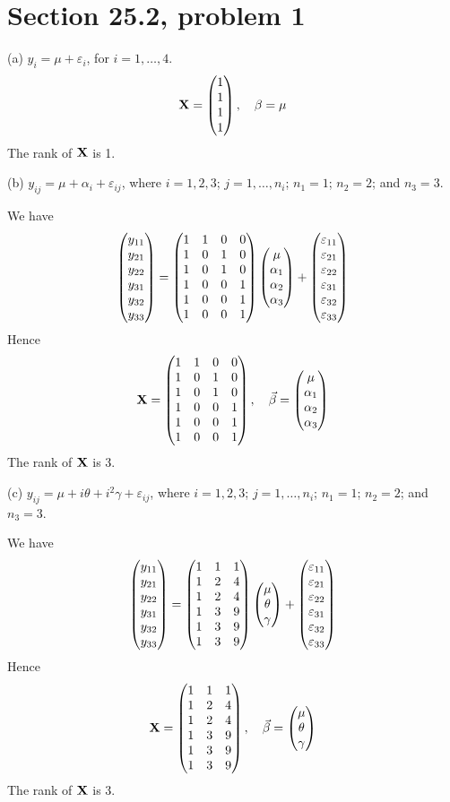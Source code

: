 \section{Section 25.2, problem 1}
(a) $y_i=\mu+\varepsilon_i$, for $i=1,\ldots,4$.
$${\bf X}=\left(\begin{matrix}1\cr1\cr1\cr1\end{matrix}\right),\quad
{\beta}=\mu$$
The rank of $\bf X$ is 1.

\bigskip
\noindent
(b) $y_{ij}=\mu+\alpha_i+\varepsilon_{ij}$,
where $i=1,2,3$; $j=1,\ldots,n_i$; $n_1=1$; $n_2=2$; and $n_3=3$.

\bigskip
\noindent
We have
$$\left(\begin{matrix}
y_{11}\cr y_{21}\cr y_{22}\cr y_{31}\cr y_{32}\cr y_{33}
\end{matrix}\right)=
\left(\begin{matrix}
1 & 1 & 0 & 0\cr
1 & 0 & 1 & 0\cr
1 & 0 & 1 & 0\cr
1 & 0 & 0 & 1\cr
1 & 0 & 0 & 1\cr
1 & 0 & 0 & 1
\end{matrix}\right)
\left(\begin{matrix}
\mu\cr\alpha_1\cr\alpha_2\cr\alpha_3
\end{matrix}\right)
+\left(\begin{matrix}
\varepsilon_{11}\cr
\varepsilon_{21}\cr
\varepsilon_{22}\cr
\varepsilon_{31}\cr
\varepsilon_{32}\cr
\varepsilon_{33}
\end{matrix}\right)
$$
Hence
$${\bf X}=\left(\begin{matrix}
1 & 1 & 0 & 0\cr
1 & 0 & 1 & 0\cr
1 & 0 & 1 & 0\cr
1 & 0 & 0 & 1\cr
1 & 0 & 0 & 1\cr
1 & 0 & 0 & 1
\end{matrix}\right),\quad
{\vec\beta}=\left(\begin{matrix}
\mu\cr\alpha_1\cr\alpha_2\cr\alpha_3
\end{matrix}\right)
$$
The rank of $\bf X$ is 3.

\bigskip
\noindent
(c) $y_{ij}=\mu+i\theta+i^2\gamma+\varepsilon_{ij}$,
where $i=1,2,3$; $j=1,\ldots,n_i$; $n_1=1$; $n_2=2$; and $n_3=3$.

\bigskip
\noindent
We have
$$\left(\begin{matrix}
y_{11}\cr y_{21}\cr y_{22}\cr y_{31}\cr y_{32}\cr y_{33}
\end{matrix}\right)=
\left(\begin{matrix}
1 & 1 & 1\cr
1 & 2 & 4\cr
1 & 2 & 4\cr
1 & 3 & 9\cr
1 & 3 & 9\cr
1 & 3 & 9
\end{matrix}\right)
\left(\begin{matrix}
\mu\cr\theta\cr\gamma
\end{matrix}\right)
+\left(\begin{matrix}
\varepsilon_{11}\cr
\varepsilon_{21}\cr
\varepsilon_{22}\cr
\varepsilon_{31}\cr
\varepsilon_{32}\cr
\varepsilon_{33}
\end{matrix}\right)
$$
Hence
$${\bf X}=\left(\begin{matrix}
1 & 1 & 1\cr
1 & 2 & 4\cr
1 & 2 & 4\cr
1 & 3 & 9\cr
1 & 3 & 9\cr
1 & 3 & 9
\end{matrix}\right),\quad
{\vec\beta}=\left(\begin{matrix}
\mu\cr\theta\cr\gamma
\end{matrix}\right)
$$
The rank of $\bf X$ is 3.
